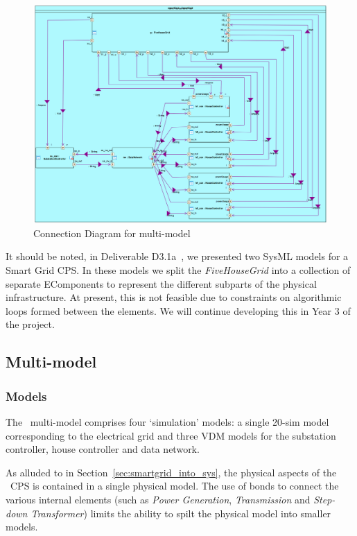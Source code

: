 \begin{figure}[htbp]
\begin{center}
\includegraphics[width=1\textwidth]{smartgrid/5house_cd.png}
\caption{Connection Diagram for \SG multi-model}
\label{fig:cd_1h}
\end{center}
\end{figure}

It should be noted, in Deliverable D3.1a~\cite{INTOCPSD31a}, we presented two SysML models for a Smart Grid CPS. In these models we split the \emph{FiveHouseGrid} into a collection of separate EComponents to represent the different subparts of the physical infrastructure. At present, this is not feasible due to constraints on algorithmic loops formed between the elements. We will continue developing this in Year 3 of the project.

\subsection{Multi-model}
\label{sec:smartgrid_into_mm}

\subsubsection{Models}

The \SG\ multi-model comprises four `simulation' models: a single 20-sim model corresponding to the electrical grid and three VDM models for the substation controller, house controller and data network.

As alluded to in Section~\ref{sec:smartgrid_into_sys}, the physical aspects of the \SG \ CPS is contained in a single physical model. The use of bonds to connect the various internal elements (such as \emph{Power Generation}, \emph{Transmission} and \emph{Step-down Transformer}) limits the ability to spilt the physical model into smaller models. 

